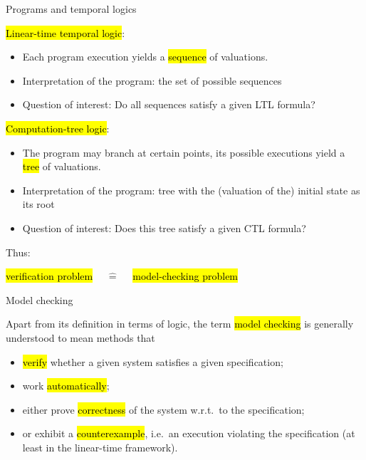 \begin{frame}{Programs and temporal logics}

\hl{Linear-time temporal logic}:
\begin{itemize}
\item Each program execution yields a \hl{sequence} of valuations.
\item Interpretation of the program: the set of possible sequences
\item Question of interest: Do all sequences satisfy a given LTL formula?
\end{itemize}

\bigskip
\hl{Computation-tree logic}:
\begin{itemize}
\item The program may branch at certain points, its possible executions
   yield a \hl{tree} of valuations.
\item Interpretation of the program: tree with the (valuation of the)
   initial state as its root
\item Question of interest: Does this tree satisfy a given CTL formula?
\end{itemize}

\bigskip
Thus:
\begin{center}
\hl{verification problem} \ \ $\widehat=$ \ \ \hl{model-checking problem}
\end{center}

\end{frame}



\begin{frame}{Model checking}

Apart from its definition in terms of logic, the term \hl{model checking} is generally understood to mean methods that
\begin{itemize}
\item \hl{verify} whether a given system satisfies a given specification;
\item work \hl{automatically};
\item either prove \hl{correctness} of the system w.r.t.\ to the specification;
\item or exhibit a \hl{counterexample}, i.e.\ an execution violating the
   specification (at least in the linear-time framework).
\end{itemize}

\end{frame}

